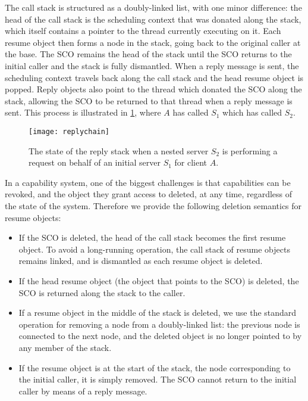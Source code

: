 The call stack is structured as a doubly-linked list, with one minor difference: the head of the
call stack is the scheduling context that was donated along the stack, which itself contains a
pointer to the thread currently executing on it. Each resume object then forms a node in the
stack, going back to the original caller at the base. The \gls{SCO} remains the head of the stack
until the \gls{SCO} returns to the initial caller and the stack is fully dismantled.  When a reply
message is sent, the scheduling context travels back along the call stack and the head resume object
is popped.  Reply objects also point to the thread which donated the \gls{SCO} along the stack,
allowing the \gls{SCO} to be returned to that thread when a reply message is sent.  This process is
illustrated in \cref{f:reply-stack}, where $A$ has called $S_{1}$ which has called  $S_{2}$.

\begin{figure}[t]
    \centering
    \texttt{[image: replychain]}
    \caption[Reply stack example]{The state of the reply stack when a nested server $S_{2}$ is
performing a request on behalf of an initial server $S_{1}$ for client $A$.}
    \label{f:reply-stack}
\end{figure}

In a capability system, one of the biggest challenges is that capabilities can be revoked, and the
object they grant access to deleted, at any time, regardless of the state of the system. Therefore
we provide the following deletion semantics for resume objects:

\begin{itemize}
    \item If the \gls{SCO} is deleted, the head of the call stack becomes the first resume object. To avoid
        a long-running operation, the call stack of resume objects remains linked, and is dismantled
        as each resume object is deleted.
    \item If the head resume object (the object that points to the \gls{SCO}) is deleted, the \gls{SCO} is
        returned along the stack to the caller. 
    \item If a resume object in the middle of the stack is deleted, we use the standard operation 
        for removing
        a node from a doubly-linked list: the previous node is connected to the next node,
        and the deleted object is no longer pointed to by any member of the stack.
    \item If the resume object is at the start of the stack, \ie the node corresponding to the initial
        caller, it is simply removed. The \gls{SCO} cannot return to the initial caller by means of a reply
        message.
\end{itemize}

